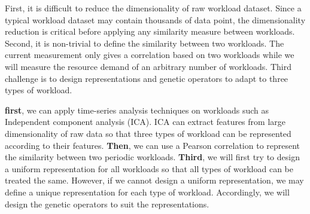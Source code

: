\begin{enumerate}
	First, it is difficult to reduce the dimensionality of raw workload dataset. Since a typical workload dataset may contain thousands of data point, the dimensionality reduction is critical before applying any similarity measure between workloads. Second, it is non-trivial to define the similarity between two workloads. The current measurement \cite{Verma:2009wi} only gives a correlation based on two workloads while we will measure the resource demand of an arbitrary number of workloads. Third challenge is to design representations and genetic operators to adapt to three types of workload.

	 \textbf{first}, we can apply time-series analysis techniques on workloads such as Independent component analysis (ICA). ICA can extract features from large dimensionality of raw data so that three types of workload can be represented according to their features. \textbf{Then}, we can use a Pearson correlation to represent the similarity between two periodic workloads. \textbf{Third}, we will first try to design a uniform representation for all workloads so that all types of workload can be treated the same. However, if we cannot design a uniform representation, we may define a unique representation for each type of workload. Accordingly, we will design the genetic operators to suit the representations. 






\end{enumerate}
